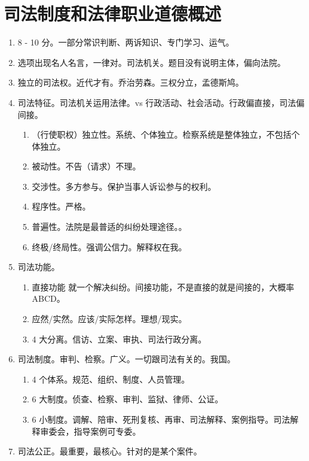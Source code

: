 \section{司法制度和法律职业道德概述}
\begin{enumerate}
  \item 8 - 10 分。一部分常识判断、两诉知识、专门学习、运气。
  \item 选项出现名人名言，一律对。司法机关。题目没有说明主体，偏向法院。
  \item 独立的司法权。近代才有。乔治劳森。三权分立，孟德斯鸠。
  \item 司法特征。司法机关运用法律。vs 行政活动、社会活动。行政偏直接，司法偏间接。
        \begin{enumerate}
          \item （行使职权）独立性。系统、个体独立。检察系统是整体独立，不包括个体独立。
          \item 被动性。不告（请求）不理。
          \item 交涉性。多方参与。保护当事人诉讼参与的权利。
          \item 程序性。严格。
          \item 普遍性。法院是最普适的纠纷处理途径。。
          \item 终极/终局性。强调公信力。解释权在我。
        \end{enumerate}
  \item 司法功能。
        \begin{enumerate}
          \item 直接功能 \yjt 就一个解决纠纷。间接功能，不是直接的就是间接的，大概率 ABCD。
          \item 应然/实然。应该/实际怎样。理想/现实。
          \item 4 大分离。信访、立案、审执、司法行政分离。
        \end{enumerate}
  \item 司法制度。审判、检察。广义。一切跟司法有关的。我国。
        \begin{enumerate}
          \item 4 个体系。规范、组织、制度、人员管理。
          \item 6 大制度。侦查、检察、审判、监狱、律师、公证。
          \item 6 小制度。调解、陪审、死刑复核、再审、司法解释、案例指导。司法解释审委会，指导案例可专委。
        \end{enumerate}
  \item 司法公正。最重要，最核心。针对的是某个案件。

\end{enumerate}
